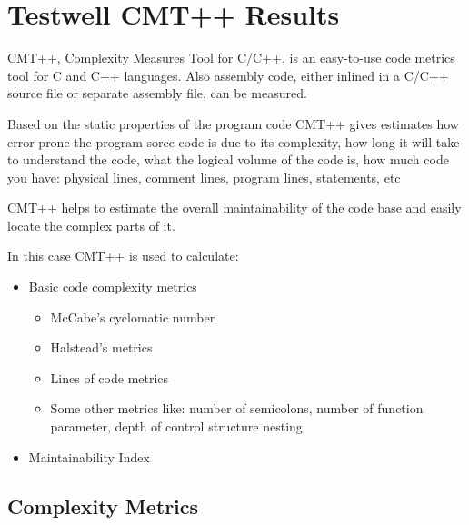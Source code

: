 \section{Testwell CMT++ Results}
\label{sec:halsted}
CMT++, Complexity Measures Tool for C/C++, is an easy-to-use code metrics tool for C and C++ languages. Also assembly code, either inlined in a C/C++ source file or separate assembly file, can be measured.

Based on the static properties of the program code CMT++ gives estimates how error prone the program sorce code is due to its complexity, how long it will take to understand the code, what the logical volume of the code is, how much code you have: physical lines, comment lines, program lines, statements, etc

CMT++ helps to estimate the overall maintainability of the code base and easily locate the complex parts of it. 

In this case CMT++ is used to calculate:
\begin{itemize}
\item Basic code complexity metrics
\begin{itemize}
\item McCabe's cyclomatic number
\item Halstead's metrics
\item Lines of code metrics
\item Some other metrics like: number of semicolons, number of function parameter, depth of control structure nesting
\end{itemize}
\item Maintainability Index
\end{itemize}

\subsection{Complexity Metrics}
